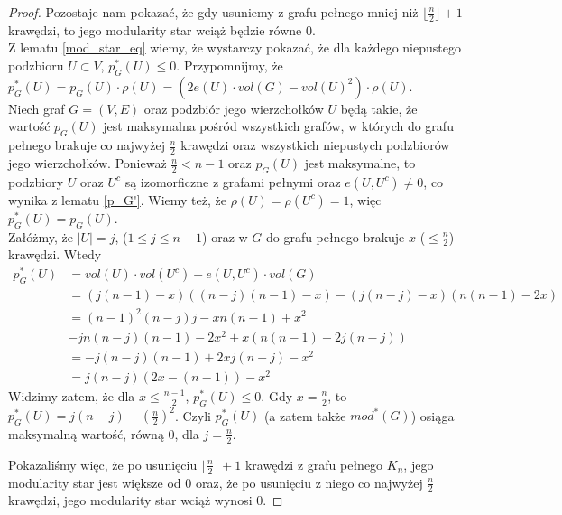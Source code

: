 \documentclass[letterpaper,12pt]{article}
\begin{document}
\begin{proof}
  Pozostaje nam pokazać, że gdy usuniemy z grafu pełnego mniej niż \(\lfloor\frac{n}{2}\rfloor + 1\) krawędzi, to jego modularity star wciąż będzie równe 0.\\
  Z lematu \ref{mod_star_eq} wiemy, że wystarczy pokazać, że dla każdego niepustego podzbioru \(U \subset V\), \(p_G^*(U) \leq 0\). Przypomnijmy, że \(p_G^*(U)=p_G(U)\cdot \rho(U)=(2e(U)\cdot vol(G) - vol(U)^2)\cdot \rho(U)\).\\

  Niech graf \(G = (V, E)\) oraz podzbiór jego wierzchołków \(U\) będą takie, że wartość \(p_G(U)\) jest maksymalna pośród wszystkich grafów, w których do grafu pełnego brakuje co najwyżej \(\frac{n}{2}\) krawędzi oraz wszystkich niepustych podzbiorów jego wierzchołków. Ponieważ \(\frac{n}{2} < n-1\) oraz \(p_G(U)\) jest maksymalne, to podzbiory \(U\) oraz \(U^c\) są izomorficzne z grafami pełnymi oraz \(e(U, U^c) \neq 0\), co wynika z lematu \ref{p_G'}. Wiemy też, że \(\rho(U)=\rho(U^c)=1\), więc \(p_G^*(U)=p_G(U)\).\\

  Załóżmy, że \(|U| = j\), (\(1 \leq j \leq n-1\)) oraz w \(G\) do grafu pełnego brakuje \(x\) (\(\leq \frac{n}{2}\)) krawędzi. Wtedy
  \begin{align*}
    p_G^*(U) & = vol(U) \cdot vol(U^c) - e(U, U^c) \cdot vol(G)           \\
             & = (j(n-1) - x)((n-j)(n-1) - x) - (j(n-j) - x)(n(n-1) - 2x) \\
             & = (n-1)^2(n-j)j-xn(n-1)+x^2                                \\
             & - jn(n-j)(n-1)-2x^2+x(n(n-1)+2j(n-j))                      \\
             & = -j(n-j)(n-1) + 2xj(n-j) - x^2                            \\
             & = j(n-j)(2x-(n-1)) - x^2
  \end{align*}
  Widzimy zatem, że dla \(x \leq \frac{n-1}{2}\), \(p_G^*(U) \leq 0\). Gdy \(x = \frac{n}{2}\), to \(p_G^*(U) = j(n-j)-(\frac{n}{2})^2\). Czyli \(p_G^*(U)\) (a zatem także \(mod^*(G)\)) osiąga maksymalną wartość, równą \(0\), dla \(j = \frac{n}{2}\).

  Pokazaliśmy więc, że po usunięciu \(\lfloor\frac{n}{2}\rfloor + 1\) krawędzi z grafu pełnego \(K_n\), jego modularity star jest większe od 0 oraz, że po usunięciu z niego co najwyżej \(\frac{n}{2}\) krawędzi, jego modularity star wciąż wynosi 0.
\end{proof}
\end{document}
